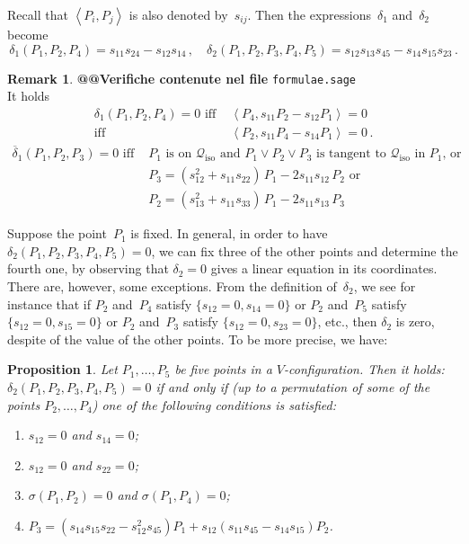 \documentclass[a4paper, 11pt, reqno]{amsart}
\theoremstyle{plain}
\newtheorem{prop}[lemma]{Proposition}
\theoremstyle{definition}
\newtheorem{rmk}[lemma]{Remark}
\newcommand{\iso}{\mathcal{Q}_{\mathrm{iso}}}
\newcommand{\scl}[2]{\left\langle {#1}, {#2} \right\rangle}
\begin{document}
Recall that $\scl{P_i}{P_j}$ is also denoted by~$s_{ij}$.
Then the expressions~$\delta_1$ and~$\delta_2$ become
%
\[
  \delta_1(P_1, P_2, P_4) = s_{11} s_{24}-s_{12}s_{14} \,, \quad
  \delta_2(P_1, P_2, P_3, P_4, P_5) = s_{12}s_{13}s_{45}-s_{14}s_{15} s_{23} \,.
\]
%
\begin{rmk}
\label{rmk:characteristics_d1_d2}
\textbf{@@Verifiche contenute nel file} \verb+formulae.sage+ \\
It holds
%
\begin{align}
\label{rmk_delta_case1}
  \delta_1(P_1, P_2, P_4) = 0 \mbox{ iff } &\scl{P_4}{s_{11}P_2-s_{12}P_1} = 0\\
  \mbox{iff } &\scl{P_2}{s_{11}P_4-s_{14}P_1} = 0 \,. \nonumber
\end{align}
%
\begin{align}
\label{rmk_delta_case2}
  \overline{\delta}_1(P_1, P_2, P_3) = 0 \mbox{ iff } &
  P_1 \mbox{ is on~$\iso$ and } P_1 \vee P_2 \vee P_3 \mbox{ is tangent to~$\iso$ in $P_1$, or} \\
  & P_3 = (s_{12}^2+s_{11}s_{22}) \, P_1 - 2s_{11}s_{12} \, P_2 \mbox{ or} \nonumber \\
  & P_2 = (s_{13}^2+s_{11}s_{33}) \, P_1 - 2s_{11}s_{13} \, P_3 \nonumber
\end{align}
%
\end{rmk}

Suppose the point~$P_1$ is fixed. In general, in order to have
$\delta_2(P_1, P_2, P_3, P_4, P_5) = 0$, we can fix three of the other points and determine the fourth one, 
by observing that $\delta_2=0$ gives a linear equation in its coordinates.
There are, however, some exceptions. 
From the definition of~$\delta_2$, we see for instance that
if $P_2$ and~$P_4$ satisfy $\{s_{12}=0, s_{14}=0\}$ or $P_2$ and~$P_5$ satisfy $\{s_{12}=0, s_{15}=0\}$ or $P_2$ and~$P_3$ satisfy
$\{s_{12}=0, s_{23}=0\}$, etc., then $\delta_2$ is zero,
despite of the value of the other points.
To be more precise, we have:
%
\begin{prop}
\label{prop:definitionP3}
Let $P_1, \dots, P_5$ be five points in a $V$-configuration. Then it holds:
$\delta_2(P_1, P_2, P_3, P_4, P_5) = 0$ if and only if (up to a permutation
of some of the points $P_2, \dots, P_4$) one of the following conditions
is satisfied:
%
\begin{enumerate}
  \item $s_{12} = 0$ and $s_{14} = 0$;
  \label{defP3_1}
  \item $s_{12} = 0$ and $s_{22} = 0$;
  \label{defP3_2}
  \item $\sigma(P_1, P_2) = 0$ and $\sigma(P_1, P_4) = 0$;
  \label{defP3_3}
  \item $P_3 = (s_{14}s_{15}s_{22}-s_{12}^2s_{45})P_1  +s_{12}(s_{11}s_{45}-s_{14}s_{15})P_2$.
  \label{defP3_4}
\end{enumerate}
%
\end{prop}
\end{document}
